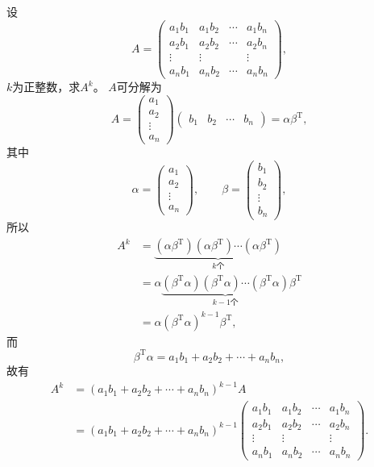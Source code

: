 设
\[
A=\begin{pmatrix}
a_1b_1&a_1b_2&\cdots&a_1b_n\\
a_2b_1&a_2b_2&\cdots&a_2b_n\\
\vdots&\vdots&&\vdots\\
a_nb_1&a_nb_2&\cdots&a_nb_n
\end{pmatrix},
\]
$k$为正整数，求$A^k$。
\sol $A$可分解为
\[
A=\begin{pmatrix}a_1\\a_2\\\vdots\\a_n\end{pmatrix}
\begin{pmatrix}b_1&b_2&\cdots&b_n\end{pmatrix}
=\alpha\beta^{\mathrm T},
\]
其中
\[
\alpha=\begin{pmatrix}a_1\\a_2\\\vdots\\a_n\end{pmatrix},\qquad
\beta=\begin{pmatrix}b_1\\b_2\\\vdots\\b_n\end{pmatrix},
\]
所以
\begin{align*}
A^k&=\underbrace{(\alpha\beta^{\mathrm T})(\alpha\beta^{\mathrm T})\cdots(\alpha\beta^{\mathrm T})}_{k\text{个}}\\
&=\alpha\underbrace{(\beta^{\mathrm T}\alpha)(\beta^{\mathrm T}\alpha)\cdots(\beta^{\mathrm T}\alpha)}_{k-1\text{个}}\beta^{\mathrm T}\\
&=\alpha(\beta^{\mathrm T}\alpha)^{k-1}\beta^{\mathrm T},
\end{align*}
而
\[\beta^{\mathrm T}\alpha=a_1b_1+a_2b_2+\cdots+a_nb_n,\]
故有
\begin{align*}
A^k&=(a_1b_1+a_2b_2+\cdots+a_nb_n)^{k-1}A\\
&=(a_1b_1+a_2b_2+\cdots+a_nb_n)^{k-1}
\begin{pmatrix}
a_1b_1&a_1b_2&\cdots&a_1b_n\\
a_2b_1&a_2b_2&\cdots&a_2b_n\\
\vdots&\vdots&&\vdots\\
a_nb_1&a_nb_2&\cdots&a_nb_n
\end{pmatrix}.
\end{align*}

